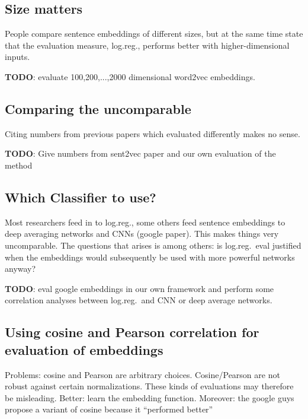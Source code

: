 \subsection{Size matters}
People compare sentence embeddings of different sizes, but at the same time state that the evaluation measure, log.reg., performs better with higher-dimensional inputs.

\textbf{TODO}: evaluate 100,200,...,2000 dimensional word2vec embeddings.

\subsection{Comparing the uncomparable}
Citing numbers from previous papers which evaluated differently makes no sense.

\textbf{TODO}: Give numbers from sent2vec paper and our own evaluation of the method 

\subsection{Which Classifier to use?}
Most researchers feed in to log.reg., some others feed sentence embeddings to deep averaging networks and CNNs (google paper). This makes things very uncomparable. The questions that arises is among others: is log.reg.\ eval justified when the embeddings would subsequently be used with more powerful networks anyway?

\textbf{TODO}: eval google embeddings in our own framework and perform some correlation analyses between log.reg.\ and CNN or deep average networks.


\subsection{Using cosine and Pearson correlation for evaluation of embeddings}
Problems: cosine and Pearson are arbitrary choices. Cosine/Pearson are not robust against certain normalizations. These kinds of evaluations may therefore be misleading. Better: learn the embedding function. Moreover: the google guys propose a variant of cosine because it ``performed better'' 


